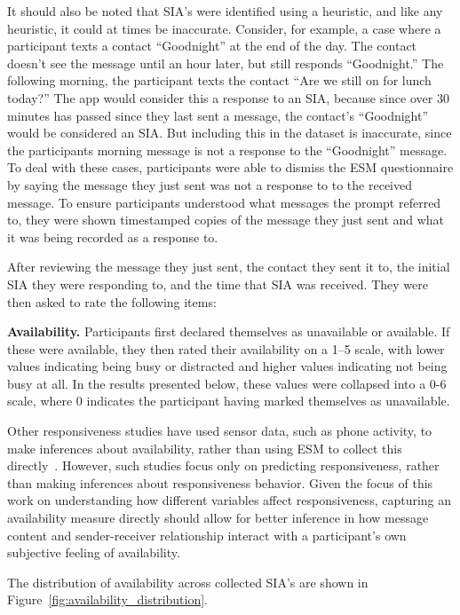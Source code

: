 \documentclass[12pt]{nuthesis}	%
\begin{document}
It should also be noted that SIA's were identified using a heuristic, and like any heuristic, it could at times be inaccurate. Consider, for example, a case where a participant texts a contact ``Goodnight'' at the end of the day. The contact doesn't see the message until an hour later, but still responds ``Goodnight.'' The following morning, the participant texts the contact ``Are we still on for lunch today?'' The app would consider this a response to an SIA, because since over 30 minutes has passed since they last sent a message, the contact's ``Goodnight'' would be considered an SIA. But including this in the dataset is inaccurate, since the participants morning message is not a response to the ``Goodnight'' message. To deal with these cases, participants were able to dismiss the ESM questionnaire by saying the message they just sent was not a response to to the received message. To ensure participants understood what messages the prompt referred to, they were shown timestamped copies of the message they just sent and what it was being recorded as a response to.

After reviewing the message they just sent, the contact they sent it to, the initial SIA they were responding to, and the time that SIA was received. They were then asked to rate the following items:

\textbf{Availability.} Participants first declared themselves as unavailable or available. If these were available, they then rated their availability on a 1--5 scale, with lower values indicating being busy or distracted and higher values indicating not being busy at all. In the results presented below, these values were collapsed into a 0-6 scale, where 0 indicates the participant having marked themselves as unavailable.

Other responsiveness studies have used sensor data, such as phone activity, to make inferences about availability, rather than using ESM to collect this directly~\citep[e.g.,][]{pielot2014didn}. However, such studies focus only on predicting responsiveness, rather than making inferences about responsiveness behavior. Given the focus of this work on understanding how different variables affect responsiveness, capturing an availability measure directly should allow for better inference in how message content and sender-receiver relationship interact with a participant's own subjective feeling of availability.

The distribution of availability across collected SIA's are shown in Figure~\ref{fig:availability_distribution}.
\end{document}
